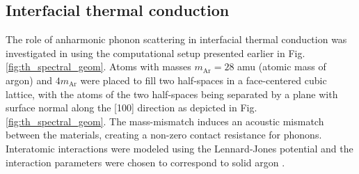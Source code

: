 \subsection{Interfacial thermal conduction}
\label{sec:results_interface}

The role of anharmonic phonon scattering in interfacial thermal conduction was investigated in  using the computational setup presented earlier in Fig. \ref{fig:th_spectral_geom}. Atoms with masses $m_{\textrm{Ar}}=28$ amu (atomic mass of argon) and $4m_{\textrm{Ar}}$ were placed to fill two half-spaces in a face-centered cubic lattice, with the atoms of the two half-spaces being separated by a plane with surface normal along the [100] direction as depicted in Fig. \ref{fig:th_spectral_geom}. The mass-mismatch induces an acoustic mismatch between the materials, creating a non-zero contact resistance for phonons. Interatomic interactions were modeled using the Lennard-Jones potential \cite{allentildesley} and the interaction parameters were chosen to correspond to solid argon \cite{allentildesley}. 

